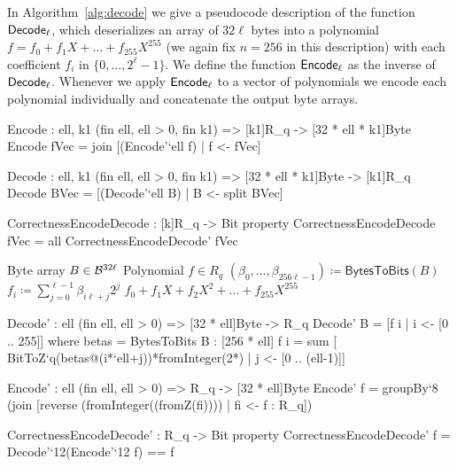 In Algorithm~\ref{alg:decode} we give a pseudocode description of the
function $\mathsf{Decode}_\ell$, which deserializes an array of $32\ell$ bytes
into a polynomial $f = f_0 + f_1X + \dots + f_{255}X^{255}$ 
(we again fix $n=256$ in this description) with each
coefficient $f_i$ in  $\{0,\dots,2^\ell-1\}$. 
We define the function $\mathsf{Encode}_\ell$ as the inverse of $\mathsf{Decode}_\ell$.
Whenever we apply $\mathsf{Encode}_\ell$ to a vector of polynomials we encode
each polynomial individually and concatenate the output byte arrays.

\begin{code}
  Encode : {ell, k1} (fin ell, ell > 0, fin k1) => [k1]R_q -> [32 * ell * k1]Byte
  Encode fVec = join [(Encode'`{ell} f) | f <- fVec]
  
  Decode : {ell, k1} (fin ell, ell > 0, fin k1) => [32 * ell * k1]Byte -> [k1]R_q
  Decode BVec = [(Decode'`{ell} B) | B <- split BVec]
  
  CorrectnessEncodeDecode : [k]R_q -> Bit
  property CorrectnessEncodeDecode fVec = all CorrectnessEncodeDecode' fVec
\end{code}

\begin{algorithm}
  \caption{$\Decode_\ell\colon\Bytes^{32\ell}\rightarrow R_q$
  }
  \label{alg:decode}
  \begin{algorithmic}
    \Require Byte array $B \in \mathcal{B}^{32\ell}$ 
    \Ensure Polynomial $f \in R_q$
    \State $(\beta_0,\dots,\beta_{256\ell-1}) \coloneqq \mathsf{BytesToBits}(B)$
      \State $f_i \coloneqq \sum_{j=0}^{\ell-1}\beta_{i\ell+j}2^{j}$
    \EndFor
    \State \Return $f_0 + f_1X + f_2X^2 + \dots + f_{255}X^{255}$
  \end{algorithmic}
\end{algorithm}

\begin{code}
  Decode' : {ell} (fin ell, ell > 0) => [32 * ell]Byte -> R_q
  Decode' B = [f i | i <- [0 .. 255]]
      where betas = BytesToBits B : [256 * ell]
            f i = sum [ BitToZ`{q}(betas@(i*`ell+j))*fromInteger(2^^j)
                      | j <- [0 .. (ell-1)]]
  
  Encode' : {ell} (fin ell, ell > 0) => R_q -> [32 * ell]Byte
  Encode' f = groupBy`{8} (join [reverse (fromInteger((fromZ(fi)))) | fi <- f : R_q])
  
  CorrectnessEncodeDecode' : R_q -> Bit
  property CorrectnessEncodeDecode' f = Decode'`{12}(Encode'`{12} f) == f
\end{code}

